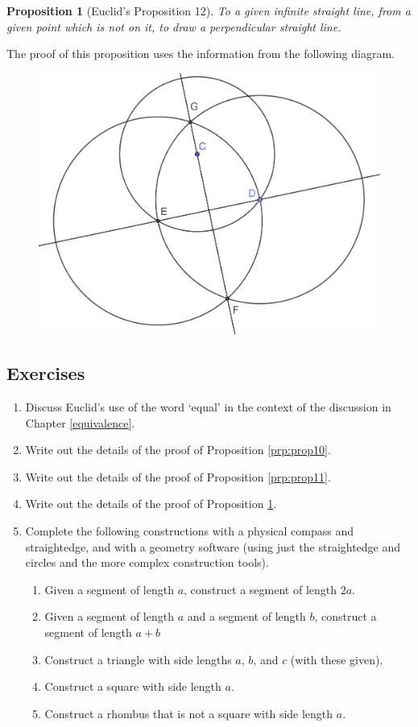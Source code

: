 \documentclass[
]{book}
\providecommand{\tightlist}{%
  \setlength{\itemsep}{0pt}\setlength{\parskip}{0pt}}
\newtheorem{proposition}{Proposition}[chapter]
\theoremstyle{definition}
\theoremstyle{definition}
\theoremstyle{definition}
\theoremstyle{definition}
\theoremstyle{remark}
\begin{document}
\begin{proposition}[Euclid's Proposition 12]
\protect\hypertarget{prp:prop12}{}\label{prp:prop12}To a given infinite straight line, from a given point which is not on it, to draw a perpendicular straight line.
\end{proposition}

The proof of this proposition uses the information from the following diagram.

\begin{figure}

{\centering \includegraphics[width=0.45\linewidth]{images/Prop12} 

}

\end{figure}

\hypertarget{exercises-38}{%
\subsection{Exercises}\label{exercises-38}}

\begin{enumerate}
\def\labelenumi{\arabic{enumi}.}
\item
  Discuss Euclid's use of the word `equal' in the context of the discussion in Chapter \ref{equivalence}.
\item
  Write out the details of the proof of Proposition \ref{prp:prop10}.
\item
  Write out the details of the proof of Proposition \ref{prp:prop11}.
\item
  Write out the details of the proof of Proposition \ref{prp:prop12}.
\item
  Complete the following constructions with a physical compass and straightedge, and with a geometry software (using just the straightedge and circles and the more complex construction tools).

  \begin{enumerate}
  \def\labelenumii{\alph{enumii}.}
  \tightlist
  \item
    Given a segment of length \(a\), construct a segment of length \(2a\).
  \item
    Given a segment of length \(a\) and a segment of length \(b\), construct a segment of length \(a+b\)
  \item
    Construct a triangle with side lengths \(a\), \(b\), and \(c\) (with these given).
  \item
    Construct a square with side length \(a\).
  \item
    Construct a rhombus that is not a square with side length \(a\).
  \end{enumerate}
\end{enumerate}
\end{document}
